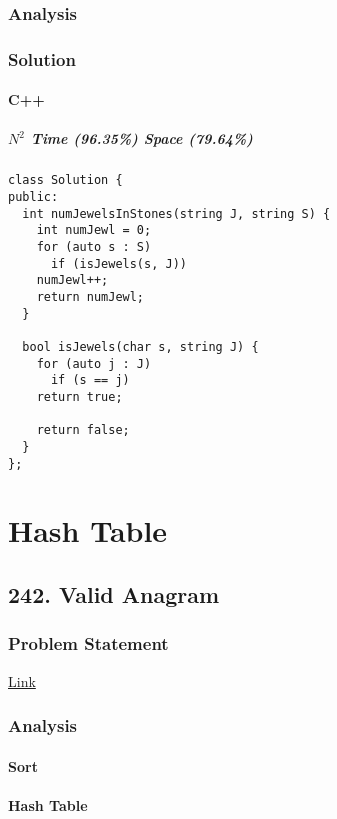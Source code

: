 \documentclass[12pt]{book}
\begin{document}
\section{Analysis}
\label{sec:org6c148a5}
\section{Solution}
\label{sec:org129ee00}
\subsection{C++}
\label{sec:org24b0b9d}
\subsubsection{\(N^2\) Time (96.35\%) Space (79.64\%)}
\label{sec:org98d4a98}
\begin{verbatim}
class Solution {
public:
  int numJewelsInStones(string J, string S) {
    int numJewl = 0;
    for (auto s : S)
      if (isJewels(s, J))
	numJewl++;
    return numJewl;
  }

  bool isJewels(char s, string J) {
    for (auto j : J)
      if (s == j)
	return true;

    return false;
  }
};
\end{verbatim}
\part{Hash Table}
\label{sec:org9e5e372}
\chapter{242. Valid Anagram}
\label{sec:org2572a84}
\section{Problem Statement}
\label{sec:org0a240f2}
\href{https://leetcode.com/problems/valid-anagram/}{Link}
\section{Analysis}
\label{sec:org8ae84ae}
\subsection{Sort}
\label{sec:org6977146}
\subsection{Hash Table}
\label{sec:orgce2a463}
\end{document}
